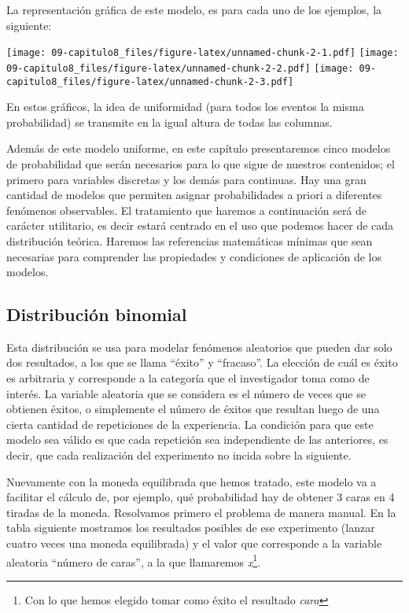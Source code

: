 \documentclass[]{article}
\let\rmarkdownfootnote\footnote%
\def\footnote{\protect\rmarkdownfootnote}
\begin{document}
La representación gráfica de este modelo, es para cada uno de los
ejemplos, la siguiente:

\texttt{[image: 09-capitulo8\_files/figure-latex/unnamed-chunk-2-1.pdf]}
\texttt{[image: 09-capitulo8\_files/figure-latex/unnamed-chunk-2-2.pdf]}
\texttt{[image: 09-capitulo8\_files/figure-latex/unnamed-chunk-2-3.pdf]}

En estos gráficos, la idea de uniformidad (para todos los eventos la
misma probabilidad) se transmite en la igual altura de todas las
columnas.

Además de este modelo uniforme, en este capítulo presentaremos cinco
modelos de probabilidad que serán necesarios para lo que sigue de
nuestros contenidos; el primero para variables discretas y los demás
para continuas. Hay una gran cantidad de modelos que permiten asignar
probabilidades a priori a diferentes fenómenos observables. El
tratamiento que haremos a continuación será de carácter utilitario, es
decir estará centrado en el uso que podemos hacer de cada distribución
teórica. Haremos las referencias matemáticas mínimas que sean necesarias
para comprender las propiedades y condiciones de aplicación de los
modelos.

\hypertarget{distribuciuxf3n-binomial}{%
\subsection{Distribución binomial}\label{distribuciuxf3n-binomial}}

Esta distribución se usa para modelar fenómenos aleatorios que pueden
dar solo dos resultados, a los que se llama ``éxito'' y ``fracaso''. La
elección de cuál es éxito es arbitraria y corresponde a la categoría que
el investigador toma como de interés. La variable aleatoria que se
considera es el número de veces que se obtienen éxitos, o simplemente el
número de éxitos que resultan luego de una cierta cantidad de
repeticiones de la experiencia. La condición para que este modelo sea
válido es que cada repetición sea independiente de las anteriores, es
decir, que cada realización del experimento no incida sobre la
siguiente.

Nuevamente con la moneda equilibrada que hemos tratado, este modelo va a
facilitar el cálculo de, por ejemplo, qué probabilidad hay de obtener 3
caras en 4 tiradas de la moneda. Resolvamos primero el problema de
manera manual. En la tabla siguiente mostramos los resultados posibles
de ese experimento (lanzar cuatro veces una moneda equilibrada) y el
valor que corresponde a la variable aleatoria ``número de caras'', a la
que llamaremos \emph{x}\footnote{Con lo que hemos elegido tomar como
  éxito el resultado \emph{cara}}.
\end{document}
